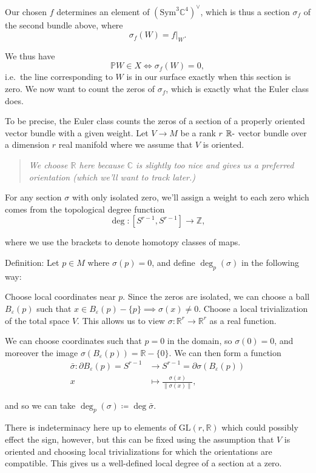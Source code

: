 \documentclass[11pt]{scrreprt}
\theoremstyle{definition}
\newcommand{\RR}[0]{{\mathbb{R}}}
\newcommand{\ZZ}[0]{{\mathbb{Z}}}
\newcommand{\CC}[0]{{\mathbb{C}}}
\newcommand{\PP}[0]{{\mathbb{P}}}
\newcommand{\GL}[0]{{\text{GL}}}
\newcommand{\dual}[0]{\vee}
\newcommand{\sym}[0]{\mathrm{Sym}}
\newcommand{\theset}[1]{\{{#1}\}}
\newcommand{\norm}[1]{{{\lVert}{#1}{\rVert}}}
\newcommand{\restrictionof}[2]{{\left.{#1}\right|_{#2}}}
\newcommand{\dash}[0]{{\hbox{-}}}
\newcommand{\del}[0]{{\partial}}
\newcommand{\definedas}[0]{\coloneqq}
\begin{document}
Our chosen \(f\) determines an element of \((\sym^3 \CC^4)^\dual\),
which is thus a section \(\sigma_f\) of the second bundle above, where
\[
\sigma_f(W) = \restrictionof{f}{W}.
\]

We thus have \[
\PP W \in X \iff \sigma_f(W) = 0,
\] i.e.~the line corresponding to \(W\) is in our surface exactly when
this section is zero. We now want to count the zeros of \(\sigma_f\),
which is exactly what the Euler class does.

To be precise, the Euler class counts the zeros of a section of a
properly oriented vector bundle with a given weight. Let \(V\to M\) be a
rank \(r\) \(\RR\dash\) vector bundle over a dimension \(r\) real
manifold where we assume that \(V\) is oriented.

\begin{quote}\textit{
We choose \(\RR\) here because \(\CC\) is slightly too nice and gives us
a preferred orientation (which we'll want to track later.)
}\end{quote}

For any section \(\sigma\) with only isolated zero, we'll assign a
weight to each zero which comes from the topological degree function \[
\deg: [S^{r-1}, S^{r-1}] \to \ZZ,
\]

where we use the brackets to denote homotopy classes of maps.

Definition: Let \(p\in M\) where \(\sigma(p) = 0\), and define
\(\deg_p(\sigma)\) in the following way:

Choose local coordinates near \(p\). Since the zeros are isolated, we
can choose a ball \(B_\varepsilon(p)\) such that
\(x\in B_\varepsilon(p) - \theset{p} \implies \sigma(x) \neq 0\). Choose
a local trivialization of the total space \(V\). This allows us to view
\(\sigma: \RR^r \to \RR^r\) as a real function.

We can choose coordinates such that \(p = 0\) in the domain, so
\(\sigma(0) = 0\), and moreover the image
\(\sigma(B_\varepsilon(p)) = \RR - \theset{0}\). We can then form a
function
\begin{align*}
\bar\sigma: \del B_\varepsilon(p) = S^{r-1} &\to S^{r-1} = \del \sigma(B_\varepsilon(p)) \\
x &\mapsto \frac{\sigma(x)} {\norm{\sigma(x)}},
\end{align*}

and so we can take \(\deg_p(\sigma) \definedas \deg \bar \sigma\).

There is indeterminacy here up to elements of \(\GL(r, \RR)\) which
could possibly effect the sign, however, but this can be fixed using the
assumption that \(V\) is oriented and choosing local trivializations for
which the orientations are compatible. This gives us a well-defined
local degree of a section at a zero.
\end{document}
